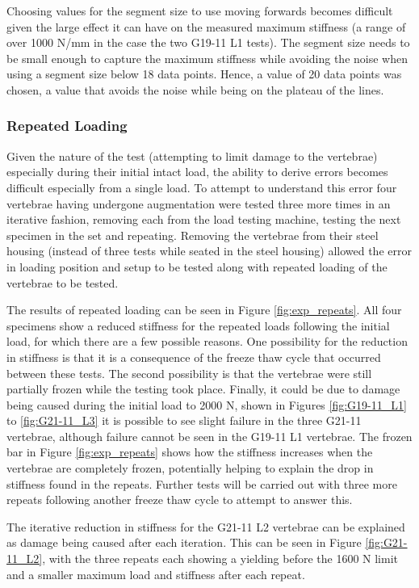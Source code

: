 Choosing values for the segment size to use moving forwards becomes difficult
given the large effect it can have on the measured maximum stiffness (a range of
over 1000 N/mm in the case the two G19-11 L1 tests). The segment size needs to
be small enough to capture the maximum stiffness while avoiding the noise when
using a segment size below 18 data points. Hence, a value of 20 data points was
chosen, a value that avoids the noise while being on the plateau of the lines.


\subsubsection{Repeated Loading}

Given the nature of the test (attempting to limit damage to the vertebrae)
especially during their initial intact load, the ability to derive errors
becomes difficult especially from a single load. To attempt to understand this
error four vertebrae having undergone augmentation were tested three more times
in an iterative fashion, removing each from the load testing machine, testing
the next specimen in the set and repeating. Removing the vertebrae from their
steel housing (instead of three tests while seated in the steel housing) allowed
the error in loading position and setup to be tested along with repeated loading
of the vertebrae to be tested.

The results of repeated loading can be seen in Figure \ref{fig:exp_repeats}. All
four specimens show a reduced stiffness for the repeated loads following the
initial load, for which there are a few possible reasons. One possibility for
the reduction in stiffness is that it is a consequence of the freeze thaw cycle
that occurred between these tests. The second possibility is that the vertebrae
were still partially frozen while the testing took place. Finally, it could be
due to damage being caused during the initial load to 2000 N, shown in Figures
\ref{fig:G19-11_L1} to \ref{fig:G21-11_L3} it is possible to see slight failure
in the three G21-11 vertebrae, although failure cannot be seen in the G19-11 L1
vertebrae. The frozen bar in Figure \ref{fig:exp_repeats} shows how the
stiffness increases when the vertebrae are completely frozen, potentially
helping to explain the drop in stiffness found in the repeats. Further tests
will be carried out with three more repeats following another freeze thaw cycle
to attempt to answer this.

The iterative reduction in stiffness for the G21-11 L2 vertebrae can be
explained as damage being caused after each iteration. This can be seen in
Figure \ref{fig:G21-11_L2}, with the three repeats each showing a yielding
before the 1600 N limit and a smaller maximum load and stiffness after each
repeat.

